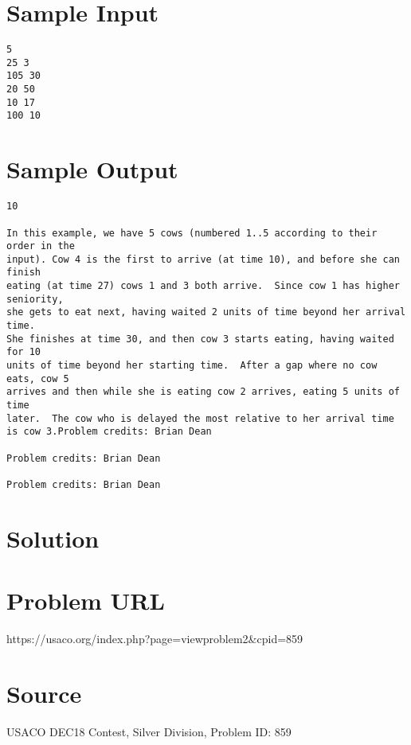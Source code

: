 \documentclass[12pt]{article}
\begin{document}
\section*{Sample Input}
\begin{verbatim}
5
25 3
105 30
20 50
10 17
100 10
\end{verbatim}

\section*{Sample Output}
\begin{verbatim}
10

In this example, we have 5 cows (numbered 1..5 according to their order in the
input). Cow 4 is the first to arrive (at time 10), and before she can finish
eating (at time 27) cows 1 and 3 both arrive.  Since cow 1 has higher seniority,
she gets to eat next, having waited 2 units of time beyond her arrival time. 
She finishes at time 30, and then cow 3 starts eating, having waited for 10
units of time beyond her starting time.  After a gap where no cow eats, cow 5
arrives and then while she is eating cow 2 arrives, eating 5 units of time
later.  The cow who is delayed the most relative to her arrival time is cow 3.Problem credits: Brian Dean

Problem credits: Brian Dean

Problem credits: Brian Dean
\end{verbatim}

\section*{Solution}


\section*{Problem URL}
https://usaco.org/index.php?page=viewproblem2&cpid=859

\section*{Source}
USACO DEC18 Contest, Silver Division, Problem ID: 859
\end{document}
